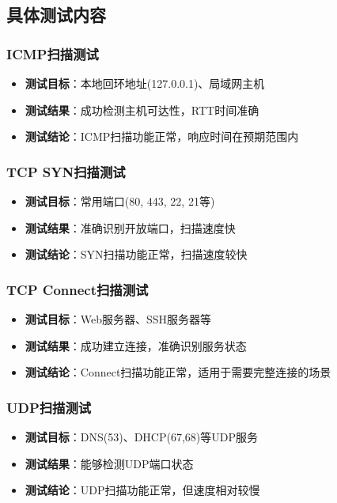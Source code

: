 \documentclass[12pt,hyperref,a4paper,UTF8]{ctexart}
\begin{document}
\subsection{具体测试内容}

\subsubsection{ICMP扫描测试}
\begin{itemize}
    \item \textbf{测试目标}：本地回环地址(127.0.0.1)、局域网主机
    \item \textbf{测试结果}：成功检测主机可达性，RTT时间准确
    \item \textbf{测试结论}：ICMP扫描功能正常，响应时间在预期范围内
\end{itemize}

\subsubsection{TCP SYN扫描测试}
\begin{itemize}
    \item \textbf{测试目标}：常用端口(80, 443, 22, 21等)
    \item \textbf{测试结果}：准确识别开放端口，扫描速度快
    \item \textbf{测试结论}：SYN扫描功能正常，扫描速度较快
\end{itemize}

\subsubsection{TCP Connect扫描测试}
\begin{itemize}
    \item \textbf{测试目标}：Web服务器、SSH服务器等
    \item \textbf{测试结果}：成功建立连接，准确识别服务状态
    \item \textbf{测试结论}：Connect扫描功能正常，适用于需要完整连接的场景
\end{itemize}

\subsubsection{UDP扫描测试}
\begin{itemize}
    \item \textbf{测试目标}：DNS(53)、DHCP(67,68)等UDP服务
    \item \textbf{测试结果}：能够检测UDP端口状态
    \item \textbf{测试结论}：UDP扫描功能正常，但速度相对较慢
\end{itemize}
\end{document}

